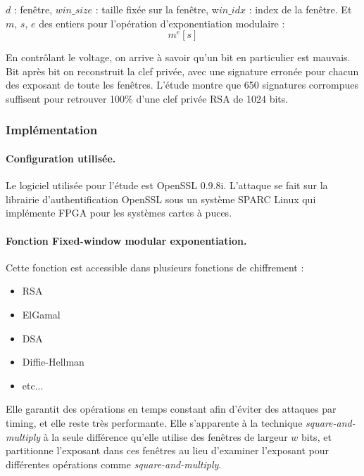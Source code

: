 			$d$ : fenêtre, $win\_size$ : taille fixée sur la fenêtre, w$in\_idx$ : index de la fenêtre. Et $m$, $s$, $e$ des entiers pour l'opération d'exponentiation modulaire :
			$$ m^e [s]$$

			En contrôlant le voltage, on arrive à savoir qu'un bit en particulier est mauvais. Bit après bit on reconstruit la clef privée, avec une signature erronée pour chacun des exposant de toute les fenêtres. L'étude montre que 650 signatures corrompues suffisent pour retrouver 100\% d'une clef privée RSA de 1024 bits. 

		
		\subsubsection{Implémentation}
			
			\paragraph{Configuration utilisée.\\}
			
			Le logiciel utilisée pour l'étude est OpenSSL 0.9.8i. L'attaque se fait sur la librairie d'authentification OpenSSL sous un système SPARC Linux qui implémente FPGA pour les systèmes cartes à puces.

			\paragraph{Fonction Fixed-window modular exponentiation.\\}

			Cette fonction est accessible dans plusieurs fonctions de chiffrement :
			\begin{itemize}
			\item RSA
			\item ElGamal
			\item DSA
			\item Diffie-Hellman
			\item etc...
			\end{itemize}
		
			Elle garantit des opérations en temps constant afin d'éviter des attaques par timing, et elle reste très performante. Elle s'apparente à la technique \textit{square-and-multiply} à la seule différence qu'elle utilise des fenêtres de largeur $w$ bits, et partitionne l'exposant dans ces fenêtres au lieu d'examiner l'exposant pour différentes opérations comme \textit{square-and-multiply}. \\

